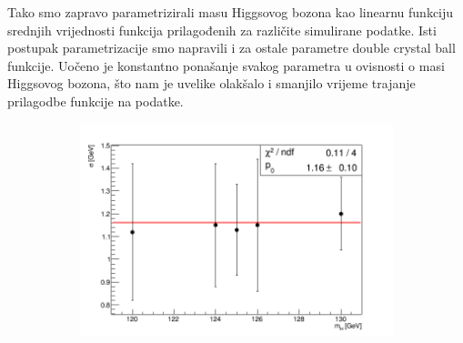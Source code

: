 \documentclass[12pt,a4paper,oneside]{article}
\begin{document}
\begin{linenumbers}
		Tako smo zapravo parametrizirali masu Higgsovog bozona kao linearnu funkciju srednjih vrijednosti funkcija prilagođenih za različite simulirane podatke. 
		Isti postupak parametrizacije smo napravili i za ostale parametre double crystal ball funkcije. Uočeno je konstantno ponašanje svakog parametra u ovisnosti o masi Higgsovog bozona, što nam je uvelike olakšalo i smanjilo vrijeme trajanje prilagodbe funkcije na podatke.
		
		\begin{figure}[H]
			\centering
			\begin{subfigure}[b]{0.7\textwidth}
				\includegraphics[width=\textwidth]{fitanje-sigma-1-8.png}
				\caption{}
				\label{fig:sigma}
			\end{subfigure}
		

\end{figure}
\end{linenumbers}
\end{document}
